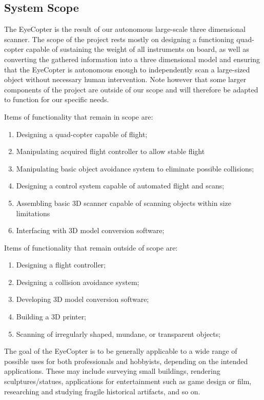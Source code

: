 \documentclass[10pt,letterpaper]{article}
\begin{document}
\subsection{System Scope}
The EyeCopter is the result of our autonomous large-scale three dimensional scanner. The scope of the project rests mostly on designing a functioning quad-copter capable of sustaining the weight of all instruments on board, as well as converting the gathered information into a three dimensional model and ensuring that the EyeCopter is autonomous enough to independently scan a large-sized object without necessary human intervention. Note however that some larger components of the project are outside of our scope and will therefore be adapted to function for our specific needs. \par 
Items of functionality that remain in scope are: 
\begin{enumerate}
	\item Designing a quad-copter capable of flight;
    \item Manipulating acquired flight controller to allow stable flight
    \item Manipulating basic object avoidance system to eliminate possible collisions;
    \item Designing a control system capable of automated flight and scans; 
    \item Assembling basic 3D scanner capable of scanning objects within size limitations
    \item Interfacing with 3D model conversion software;
\end{enumerate}
Items of functionality that remain outside of scope are:
\begin{enumerate}
	\item Designing a flight controller;
    \item Designing a collision avoidance system;
    \item Developing 3D model conversion software;
    \item Building a 3D printer;
    \item Scanning of irregularly shaped, mundane, or transparent objects;
\end{enumerate}
The goal of the EyeCopter is to be generally applicable to a wide range of possible uses for both professionals and hobbyists, depending on the intended applications. These may include surveying small buildings, rendering sculptures/statues, applications for entertainment such as game design or film, researching and studying fragile historical artifacts, and so on. 
\end{document}

